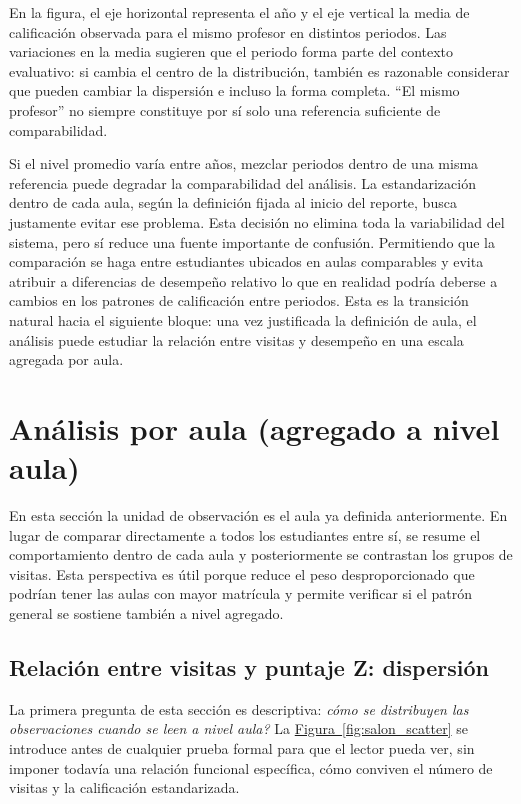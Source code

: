 \documentclass[10pt,letterpaper]{article} %
\numberwithin{figure}{subsection}
\let\oldsection\section
\renewcommand{\section}{\clearpage\oldsection}
\begin{document}
En la figura, el eje horizontal representa el año y el eje vertical la media de calificación observada para el mismo profesor en distintos periodos. Las variaciones en la media sugieren que el periodo forma parte del contexto evaluativo: si cambia el centro de la distribución, también es razonable considerar que pueden cambiar la dispersión e incluso la forma completa.  ``El mismo profesor'' no siempre constituye por sí solo una referencia suficiente de comparabilidad.

Si el nivel promedio varía entre años, mezclar periodos dentro de una misma referencia puede degradar la comparabilidad del análisis. La estandarización dentro de cada aula, según la definición fijada al inicio del reporte, busca justamente evitar ese problema. Esta decisión no elimina toda la variabilidad del sistema, pero sí reduce una fuente importante de confusión. Permitiendo que la comparación se haga entre estudiantes ubicados en aulas comparables y evita atribuir a diferencias de desempeño relativo lo que en realidad podría deberse a cambios en los patrones de calificación entre periodos. Esta es la transición natural hacia el siguiente bloque: una vez justificada la definición de aula, el análisis puede estudiar la relación entre visitas y desempeño en una escala agregada por aula.



\FloatBarrier
\section{Análisis por aula (agregado a nivel aula)}

\noindent En esta sección la unidad de observación es el aula ya definida anteriormente. En lugar de comparar directamente a todos los estudiantes entre sí, se resume el comportamiento dentro de cada aula y posteriormente se contrastan los grupos de visitas. Esta perspectiva es útil porque reduce el peso desproporcionado que podrían tener las aulas con mayor matrícula y permite verificar si el patrón general se sostiene también a nivel agregado.

\subsection{Relación entre visitas y puntaje Z: dispersión}
La primera pregunta de esta sección es descriptiva: \emph{cómo se distribuyen las observaciones cuando se leen a nivel aula?} La \hyperref[fig:salon_scatter]{Figura~\ref{fig:salon_scatter}} se introduce antes de cualquier prueba formal para que el lector pueda ver, sin imponer todavía una relación funcional específica, cómo conviven el número de visitas y la calificación estandarizada.
\end{document}
